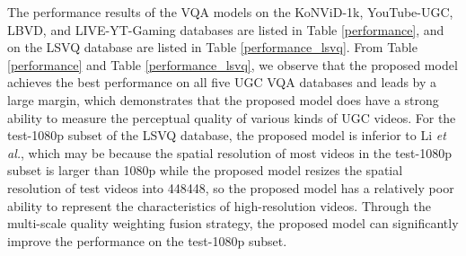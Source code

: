 \documentclass[sigconf]{acmart}
\begin{document}
The performance results of the VQA models on the KoNViD-1k, YouTube-UGC, LBVD, and LIVE-YT-Gaming databases are listed in Table \ref{performance}, and on the LSVQ database are listed in Table \ref{performance_lsvq}. From Table \ref{performance} and Table \ref{performance_lsvq}, we observe that the proposed model achieves the best performance on all five UGC VQA databases and leads by a large margin, which demonstrates that the proposed model does have a strong ability to measure the perceptual quality of various kinds of UGC videos. For the test-1080p subset of the LSVQ database, the proposed model is inferior to Li \textit{et al.}, which may be because the spatial resolution of most videos in the test-1080p subset is larger than 1080p while the proposed model resizes the spatial resolution of test videos into 448448, so the proposed model has a relatively poor ability to represent the characteristics of high-resolution videos. Through the multi-scale quality weighting fusion strategy, the proposed model can significantly improve the performance on the test-1080p subset. 
\end{document}
